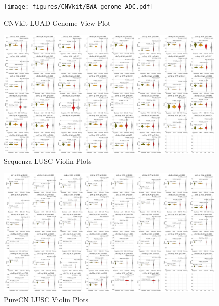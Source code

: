 \documentclass[11pt,a4paper,onecolumn,oneside]{report}
\begin{document}
                \begin{figure}[p]
                    \centering
                    \texttt{[image: figures/CNVkit/BWA-genome-ADC.pdf]}
                    \caption{CNVkit LUAD Genome View Plot}
                    \label{fig:cnvkit-ADC-genome}
                \end{figure}

                \begin{figure}[p]
                    \centering
                    \includegraphics[width=\linewidth]{figures/Sequenza/BWA-violin-SQC.pdf}
                    \caption{Sequenza LUSC Violin Plots}
                    \label{fig:sequenza-SQC-violin}
                \end{figure}

                \begin{figure}[p]
                    \centering
                    \includegraphics[width=\linewidth]{figures/PureCN/BWA-violin-SQC.pdf}
                    \caption{PureCN LUSC Violin Plots}
                    \label{fig:PureCN-SQC-violin}
                \end{figure}
\end{document}
